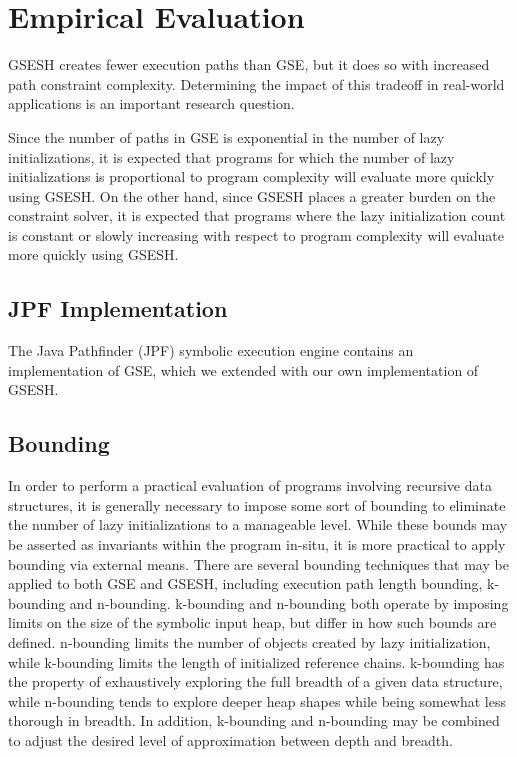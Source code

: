 \section{Empirical Evaluation}
GSESH creates fewer execution paths than GSE, but it does so with increased path constraint complexity. Determining the impact of this tradeoff in real-world applications is an important research question. 

Since the number of paths in GSE is exponential in the number of lazy initializations, it is expected that programs for which the number of lazy initializations is proportional to program complexity will evaluate more quickly using GSESH. On the other hand, since GSESH places a greater burden on the constraint solver, it is expected that programs where the lazy initialization count is constant or slowly increasing with respect to program complexity will evaluate more quickly using GSESH.

\subsection{JPF Implementation}
The Java Pathfinder (JPF) symbolic execution engine contains an implementation of GSE, which we extended with our own implementation of GSESH. 

\subsection{Bounding}
In order to perform a practical evaluation of programs involving recursive data structures, it is generally necessary to impose some sort of bounding to eliminate the number of lazy initializations to a manageable level. While these bounds may be asserted as invariants within the program in-situ, it is more practical to apply bounding via external means. There are several bounding techniques that may be applied to both GSE and GSESH, including execution path length bounding, k-bounding and n-bounding. k-bounding and n-bounding both operate by imposing limits on the size of the symbolic input heap, but differ in how such bounds are defined. n-bounding limits the number of objects created by lazy initialization, while k-bounding limits the length of initialized reference chains. k-bounding has the property of exhaustively exploring the full breadth of a given data structure, while n-bounding tends to explore deeper heap shapes while being somewhat less thorough in breadth. In addition, k-bounding and n-bounding may be combined to adjust the desired level of approximation between depth and breadth.

